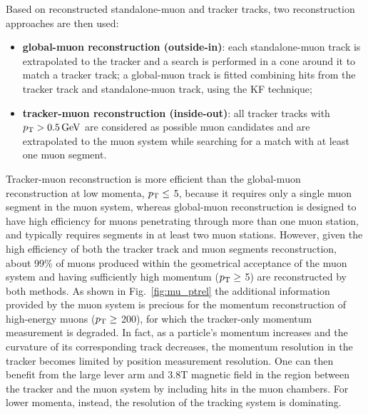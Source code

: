 Based on reconstructed standalone-muon and tracker tracks, two reconstruction approaches are then used:

\begin{itemize}
\item {\bf global-muon reconstruction (outside-in)}: each standalone-muon track is extrapolated to the tracker and a search is performed in a cone around it to match a tracker track; a global-muon track is fitted combining hits from the tracker track and standalone-muon track, using the KF technique;
\item {\bf tracker-muon reconstruction (inside-out)}: all tracker tracks with $p_{\mathrm{T}} > 0.5\,\text{Ge\hspace{-.08em}V}$ are considered as possible muon candidates and are extrapolated to the muon system while searching for a match with at least one muon segment.
\end{itemize}

Tracker-muon reconstruction is more efficient than the global-muon reconstruction at low momenta, $p_{\mathrm{T}} \leq$ 5\GeV, because it requires only a single muon segment in the muon system, whereas global-muon reconstruction is designed to have high efficiency for muons penetrating through more than one muon station, and typically requires segments in at least two muon stations. However, given the high efficiency of both the tracker track and muon segments reconstruction, about 99\% of muons produced within the geometrical acceptance of the muon system and having sufficiently high momentum ($p_{\mathrm{T}} \geq$ 5\GeV) are reconstructed by both methods. As shown in Fig.~\ref{fig:mu_ptrel} the additional information provided by the muon system is precious for the momentum reconstruction of high-energy muons ($p_{\mathrm{T}} \geq$ 200\GeV), for which the tracker-only momentum measurement is degraded. 
In fact, as a particle's momentum increases and the curvature of its corresponding track decreases, the momentum resolution in the tracker becomes limited by position measurement resolution. One can then benefit from the large lever arm and 3.8\unit{T} magnetic field in the region between the tracker and the muon system by including hits in the muon chambers. For lower momenta, instead, the resolution of the tracking system is dominating.

